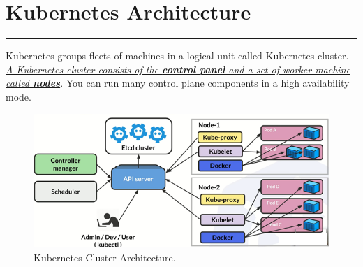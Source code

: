 \documentclass{article}
\begin{document}
\newpage
\section{Kubernetes Architecture}
\noindent
{\color{red} \rule{\linewidth}{0.5mm}}
\begin{tcolorbox}[colback=red!5!white, colframe=red!50!black,title= Kubernetes Architecture]
   Kubernetes groups fleets of machines in a logical unit called Kubernetes cluster. \underline{\textit{A Kubernetes cluster consists of the \textbf{control panel} and a set of worker machine called \textbf{nodes}}}. You can run many control plane components in a high availability mode. 
\end{tcolorbox}
\begin{figure}
\centering
\includegraphics[width=0.95\linewidth]{k8sDiagrams/K8sClusterArchitecture.png}
\caption{\label{fig:k8sClusterArchi}Kubernetes Cluster Architecture.}
\end{figure} 

\newpage
\end{document}
